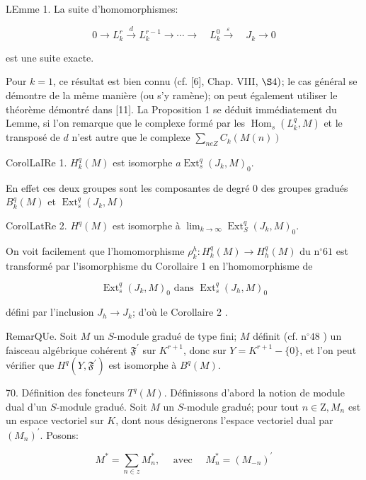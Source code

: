 LEmme 1. La suite d'homomorphismes:

$$
0 \rightarrow L_{k}^{r} \stackrel{d}{\longrightarrow} L_{k}^{r-1} \rightarrow \cdots \rightarrow \quad L_{k}^{0} \stackrel{\varepsilon}{\longrightarrow} \quad J_{k} \rightarrow 0
$$

est une suite exacte.

Pour $k=1$, ce résultat est bien connu (cf. [6], Chap. VIII, $\S 4)$; le cas général se démontre de la même manière (ou s'y ramène); on peut également utiliser le théorème démontré dans [11]. La Proposition 1 se déduit immédiatement du Lemme, si l'on remarque que le complexe formé par les $\operatorname{Hom}_{s}\left(L_{k}^{q}, M\right)$ et le transposé de $d$ n'est autre que le complexe $\sum_{n e Z} C_{k}(M(n))$

CorolLaIRe 1. $H_{k}^{q}(M)$ est isomorphe $a \operatorname{Ext}_{s}^{q}\left(J_{k}, M\right)_{0}$.

En effet ces deux groupes sont les composantes de degré 0 des groupes gradués $B_{k}^{q}(M)$ et $\operatorname{Ext}_{s}^{q}\left(J_{k}, M\right)$

CorolLatRe 2. $H^{q}(M)$ est isomorphe à $\lim _{k \rightarrow \infty} \operatorname{Ext}_{S}^{q}\left(J_{k}, M\right)_{0}$.

On voit facilement que l'homomorphisme $\rho_{k}^{h}: H_{k}^{q}(M) \rightarrow H_{h}^{q}(M)$ du $\mathrm{n}^{\circ} 61$ est transformé par l'isomorphisme du Corollaire 1 en l'homomorphisme de

$$
\operatorname{Ext}_{s}^{q}\left(J_{k}, M\right)_{0} \text { dans } \operatorname{Ext}_{s}^{q}\left(J_{h}, M\right)_{0}
$$

défini par l'inclusion $J_{h} \rightarrow J_{k}$; d'où le Corollaire 2 .

RemarQUe. Soit $M$ un $S$-module gradué de type fini; $M$ définit (cf. $\mathrm{n}^{\circ} 48$ ) un faisceau algébrique cohérent $\mathfrak{F}^{\prime}$ sur $K^{r+1}$, donc sur $Y=K^{r+1}-\{0\}$, et l'on peut vérifier que $H^{q}\left(Y, \mathfrak{F}^{\prime}\right)$ est isomorphe à $B^{q}(M)$.

70. Définition des foncteurs $T^{q}(M) .$ Définissons d'abord la notion de module dual d'un $S$-module gradué. Soit $M$ un $S$-module gradué; pour tout $n \in \mathrm{Z}, M_{n}$ est un espace vectoriel sur $K$, dont nous désignerons l'espace vectoriel dual par $\left(M_{n}\right)^{\prime} .$ Posons:

$$
M^{*}=\sum_{n \in z} M_{n}^{*}, \quad \text { avec } \quad M_{n}^{*}=\left(M_{-n}\right)^{\prime}
$$

